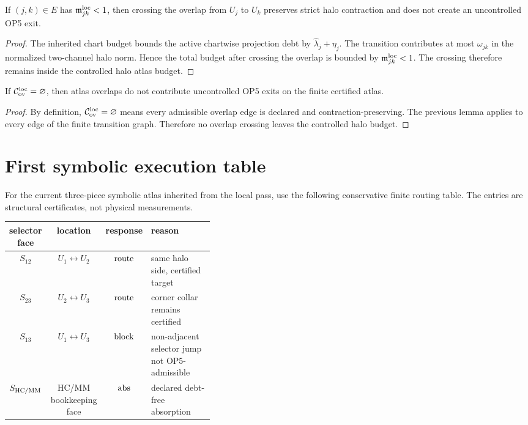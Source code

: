 \begin{lemma}
If \((j,k)\in E\) has \(\mathfrak m_{jk}^{\mathrm{loc}}<1\), then crossing the overlap from \(U_j\) to \(U_k\) preserves strict halo contraction and does not create an uncontrolled OP5 exit.
\end{lemma}

\begin{proof}
The inherited chart budget bounds the active chartwise projection debt by \(\widehat\lambda_j+\eta_j\). The transition contributes at most \(\omega_{jk}\) in the normalized two-channel halo norm. Hence the total budget after crossing the overlap is bounded by \(\mathfrak m_{jk}^{\mathrm{loc}}<1\). The crossing therefore remains inside the controlled halo atlas budget.
\end{proof}

\begin{proposition}
If \(\mathcal C_{\mathrm{ov}}^{\mathrm{loc}}=\varnothing\), then atlas overlaps do not contribute uncontrolled OP5 exits on the finite certified atlas.
\end{proposition}

\begin{proof}
By definition, \(\mathcal C_{\mathrm{ov}}^{\mathrm{loc}}=\varnothing\) means every admissible overlap edge is declared and contraction-preserving. The previous lemma applies to every edge of the finite transition graph. Therefore no overlap crossing leaves the controlled halo budget.
\end{proof}

\section{First symbolic execution table}

For the current three-piece symbolic atlas inherited from the local pass, use the following conservative finite routing table. The entries are structural certificates, not physical measurements.

\begin{center}
\small
\begin{tabular}{c|c|c|P{0.39\linewidth}}
\toprule
selector face & location & response & reason\\
\midrule
\(S_{12}\) & \(U_1\leftrightarrow U_2\) & \(\mathrm{route}\) & same halo side, certified target\\
\(S_{23}\) & \(U_2\leftrightarrow U_3\) & \(\mathrm{route}\) & corner collar remains certified\\
\(S_{13}\) & \(U_1\leftrightarrow U_3\) & \(\mathrm{block}\) & non-adjacent selector jump not OP5-admissible\\
\(S_{\mathrm{HC}/\mathrm{MM}}\) & HC/MM bookkeeping face & \(\mathrm{abs}\) & declared debt-free absorption\\
\bottomrule
\end{tabular}
\end{center}

